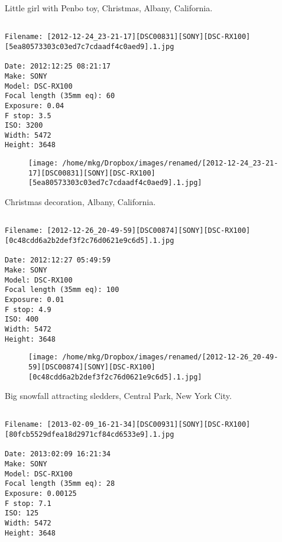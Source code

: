 \clearpage
\onecolumn
\noindent Little girl with Penbo toy, Christmas, Albany, California.
\noindent
\begin{lstlisting}

Filename: [2012-12-24_23-21-17][DSC00831][SONY][DSC-RX100][5ea80573303c03ed7c7cdaadf4c0aed9].1.jpg

Date: 2012:12:25 08:21:17
Make: SONY
Model: DSC-RX100
Focal length (35mm eq): 60
Exposure: 0.04
F stop: 3.5
ISO: 3200
Width: 5472
Height: 3648
\end{lstlisting}
\clearpage

\begin{figure}
\texttt{[image: /home/mkg/Dropbox/images/renamed/[2012-12-24\_23-21-17][DSC00831][SONY][DSC-RX100][5ea80573303c03ed7c7cdaadf4c0aed9].1.jpg]}
\end{figure}
    
\clearpage
\onecolumn
\noindent Christmas decoration, Albany, California.
\noindent
\begin{lstlisting}

Filename: [2012-12-26_20-49-59][DSC00874][SONY][DSC-RX100][0c48cdd6a2b2def3f2c76d0621e9c6d5].1.jpg

Date: 2012:12:27 05:49:59
Make: SONY
Model: DSC-RX100
Focal length (35mm eq): 100
Exposure: 0.01
F stop: 4.9
ISO: 400
Width: 5472
Height: 3648
\end{lstlisting}
\clearpage

\begin{figure}
\texttt{[image: /home/mkg/Dropbox/images/renamed/[2012-12-26\_20-49-59][DSC00874][SONY][DSC-RX100][0c48cdd6a2b2def3f2c76d0621e9c6d5].1.jpg]}
\end{figure}
    
\clearpage
\onecolumn
\noindent Big snowfall attracting sledders, Central Park, New York City.
\noindent
\begin{lstlisting}

Filename: [2013-02-09_16-21-34][DSC00931][SONY][DSC-RX100][80fcb5529dfea18d2971cf84cd6533e9].1.jpg

Date: 2013:02:09 16:21:34
Make: SONY
Model: DSC-RX100
Focal length (35mm eq): 28
Exposure: 0.00125
F stop: 7.1
ISO: 125
Width: 5472
Height: 3648
\end{lstlisting}
\clearpage

